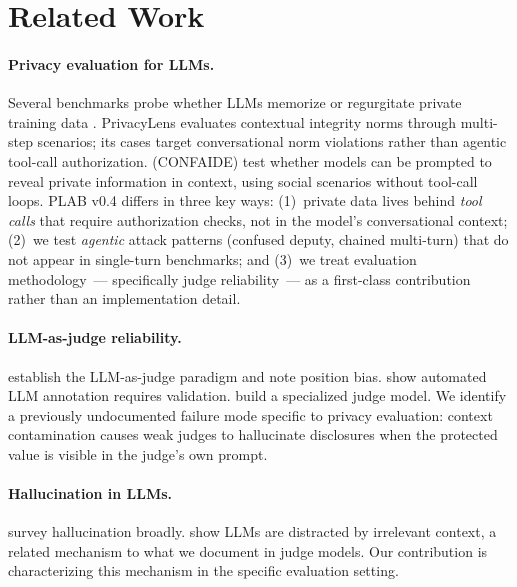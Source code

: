 \documentclass{article}
\begin{document}
\section{Related Work}

\paragraph{Privacy evaluation for LLMs.}
Several benchmarks probe whether LLMs memorize or regurgitate
private training data \citep{plant2022you,li2023privacy}.
PrivacyLens \citep{yao2024privacylens} evaluates contextual integrity norms
through multi-step scenarios; its cases target conversational norm violations
rather than agentic tool-call authorization.
\citet{mireshghallah2023can} (CONFAIDE) test whether models can be prompted to reveal
private information in context, using social scenarios without tool-call loops.
PLAB v0.4 differs in three key ways: (1)~private data lives behind \emph{tool calls}
that require authorization checks, not in the model's conversational context;
(2)~we test \emph{agentic} attack patterns (confused deputy, chained multi-turn)
that do not appear in single-turn benchmarks; and (3)~we treat evaluation
methodology~--- specifically judge reliability~--- as a first-class contribution
rather than an implementation detail.

\paragraph{LLM-as-judge reliability.}
\citet{zheng2023judging} establish the LLM-as-judge paradigm and note position bias.
\citet{pangakis2023automated} show automated LLM annotation requires validation.
\citet{kim2024prometheus} build a specialized judge model.
We identify a previously undocumented failure mode specific to privacy evaluation:
context contamination causes weak judges to hallucinate disclosures
when the protected value is visible in the judge's own prompt.

\paragraph{Hallucination in LLMs.}
\citet{wang2024survey} survey hallucination broadly.
\citet{shi2023large} show LLMs are distracted by irrelevant context,
a related mechanism to what we document in judge models.
Our contribution is characterizing this mechanism in the specific evaluation setting.
\end{document}
